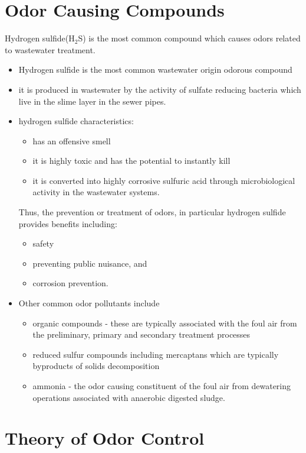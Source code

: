 \section{Odor Causing Compounds}
Hydrogen sulfide(H$_2$S) is the most common compound which causes odors related to wastewater treatment.  
\begin{itemize}
	\item Hydrogen sulfide is the most common wastewater origin odorous compound
	\item it is produced in wastewater by the activity of sulfate reducing bacteria which live in the slime layer in the sewer pipes.  
	\item hydrogen sulfide characteristics:
	\begin{itemize}
		\item has an offensive smell
		\item it is highly toxic and has the potential to instantly kill  
		\item it is converted into highly corrosive sulfuric acid through microbiological activity in the wastewater systems.  
	\end{itemize}
Thus, the prevention or treatment of odors, in particular hydrogen sulfide provides benefits including:
	\begin{itemize}
		\item safety
		\item preventing public nuisance, and
		\item  corrosion prevention.\\
	\end{itemize}
\vspace{0.5cm}
\item Other common odor pollutants include
\begin{itemize}
\item organic compounds - these are typically associated with the foul air from the preliminary, primary and secondary treatment processes
\item reduced sulfur compounds including mercaptans which are typically byproducts of solids decomposition
\item ammonia - the odor causing constituent of the foul air from dewatering operations associated with anaerobic digested sludge.\\
\end{itemize}
\end{itemize}
\afterpage{\clearpage}
\section{Theory of Odor Control}

